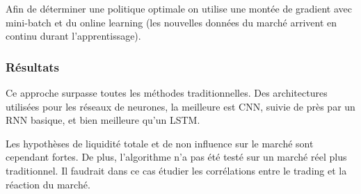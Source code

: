 \documentclass[a4paper]{article}
\begin{document}
Afin de déterminer une politique optimale on utilise une montée de gradient avec mini-batch et du online learning (les nouvelles données du marché arrivent en continu durant l'apprentissage).

\subsubsection{Résultats}

Ce approche surpasse toutes les méthodes traditionnelles. Des architectures utilisées pour les réseaux de neurones, la meilleure est CNN, suivie de près par un RNN basique, et bien meilleure qu'un LSTM.

Les hypothèses de liquidité totale et de non influence sur le marché sont cependant fortes. De plus, l'algorithme n'a pas été testé sur un marché réel plus traditionnel. Il faudrait dans ce cas étudier les corrélations entre le trading et la réaction du marché.

\nocite{*}
\printbibliography
\end{document}
